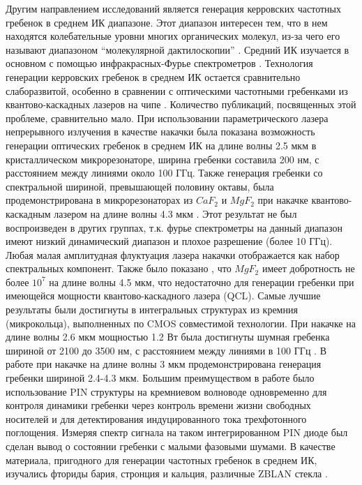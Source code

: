 Другим направлением исследований является генерация керровских частотных гребенок в среднем ИК диапазоне. Этот диапазон интересен тем, что в нем находятся колебательные уровни многих органических молекул, из-за чего его называют диапазоном “молекулярной дактилоскопии” \cite{Diddams2007,Schliesser2012}. Средний ИК изучается в основном с помощью инфракрасных-Фурье спектрометров \cite{Griffiths2006}. Технология генерации керровских гребенок в среднем ИК остается сравнительно слаборазвитой, особенно в сравнении с оптическими частотными гребенками из квантово-каскадных лазеров на чипе \cite{Hugi2012}. Количество публикаций, посвященных этой проблеме, сравнительно мало. При использовании параметрического лазера непрерывного излучения в качестве накачки была показана возможность генерации оптических гребенок в среднем ИК на длине волны 2.5 мкм в кристаллическом микрорезонаторе\cite{Wang2013}, ширина гребенки составила 200 нм, с расстоянием между линиями около 100 ГГц. Также генерация гребенки со спектральной шириной, превышающей половину октавы, была продемонстрирована в микрорезонаторах из $CaF_2$ и $MgF_2$ при накачке квантово-каскадным лазером на длине волны 4.3 мкм \cite{Savchenkov2015}. Этот результат не был воспроизведен в других группах, т.к. фурье спектрометры на данный диапазон имеют низкий динамический диапазон и плохое разрешение (более 10 ГГц). Любая малая амплитудная флуктуация лазера накачки отображается как набор спектральных компонент. Также было показано \cite{Lecaplain2016}, что $MgF_2$ имеет добротность не более $10^7$ на длине волны 4.5 мкм, что недостаточно для генерации гребенки при имеющейся мощности квантово-каскадного лазера (QCL). Самые лучшие результаты были достигнуты в интегральных структурах из кремния (микрокольца), выполненных по CMOS совместимой технологии. При накачке на длине волны 2.6 мкм мощностью 1.2 Вт была достигнуты шумная гребенка шириной от 2100 до 3500 нм, с расстоянием между линиями в 100 ГГц \cite{Griffith2015}. В работе \cite{Griffith2016} при накачке на длине волны 3 мкм продемонстрирована генерация гребенки шириной 2.4-4.3 мкм. Большим преимуществом в работе было использование PIN структуры на кремниевом волноводе одновременно для контроля динамики гребенки через контроль времени жизни свободных носителей и для детектирования индуцированного тока трехфотонного поглощения. Измеряя спектр сигнала на таком интегрированном PIN диоде был сделан вывод о состоянии гребенки с малыми фазовыми шумами. В качестве материала, пригодного для генерации частотных гребенок в среднем ИК, изучались фториды бария, стронция и кальция, различные ZBLAN стекла \cite{Grudinin2016,Way2012,Lecaplain2016}.


